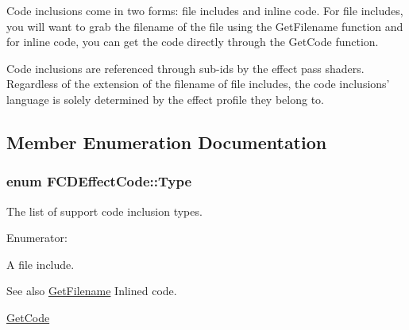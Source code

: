 Code inclusions come in two forms: file includes and inline code. For file includes, you will want to grab the filename of the file using the GetFilename function and for inline code, you can get the code directly through the GetCode function.

Code inclusions are referenced through sub-\/ids by the effect pass shaders. Regardless of the extension of the filename of file includes, the code inclusions' language is solely determined by the effect profile they belong to. 

\subsection{Member Enumeration Documentation}
\hypertarget{classFCDEffectCode_a0e492088a72daaf6e6e14c50d17c9424}{
\subsubsection[{Type}]{\setlength{\rightskip}{0pt plus 5cm}enum {\bf FCDEffectCode::Type}}}
\label{classFCDEffectCode_a0e492088a72daaf6e6e14c50d17c9424}
The list of support code inclusion types. \begin{Desc}
\item[Enumerator: ]\par
\begin{description}
\item[{\em 
\hypertarget{classFCDEffectCode_a0e492088a72daaf6e6e14c50d17c9424abd1a77e0d6fd232b43bd48113315b248}{
CODE}
\label{classFCDEffectCode_a0e492088a72daaf6e6e14c50d17c9424abd1a77e0d6fd232b43bd48113315b248}
}]A file include. \begin{DoxySeeAlso}{See also}
\hyperlink{classFCDEffectCode_a201251ceb6b7774c33b4cdd64e78b136}{GetFilename} Inlined code. 

\hyperlink{classFCDEffectCode_aeb303dd3b3ce37a77955fe4a2fa1986f}{GetCode} 
\end{DoxySeeAlso}
\end{description}
\end{Desc}



